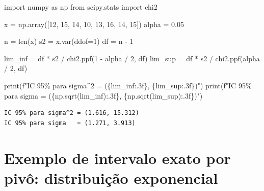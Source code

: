 \documentclass[
  letterpaper,
  DIV=11,
  numbers=noendperiod]{scrreprt}
\newenvironment{Shaded}{\begin{snugshade}}{\end{snugshade}}
\newcommand{\BuiltInTok}[1]{\textcolor[rgb]{0.00,0.23,0.31}{#1}}
\newcommand{\DecValTok}[1]{\textcolor[rgb]{0.68,0.00,0.00}{#1}}
\newcommand{\FloatTok}[1]{\textcolor[rgb]{0.68,0.00,0.00}{#1}}
\newcommand{\ImportTok}[1]{\textcolor[rgb]{0.00,0.46,0.62}{#1}}
\newcommand{\NormalTok}[1]{\textcolor[rgb]{0.00,0.23,0.31}{#1}}
\newcommand{\OperatorTok}[1]{\textcolor[rgb]{0.37,0.37,0.37}{#1}}
\newcommand{\SpecialCharTok}[1]{\textcolor[rgb]{0.37,0.37,0.37}{#1}}
\newcommand{\SpecialStringTok}[1]{\textcolor[rgb]{0.13,0.47,0.30}{#1}}
\begin{document}
\begin{Shaded}
\begin{Highlighting}[]
\ImportTok{import}\NormalTok{ numpy }\ImportTok{as}\NormalTok{ np}
\ImportTok{from}\NormalTok{ scipy.stats }\ImportTok{import}\NormalTok{ chi2}

\NormalTok{x }\OperatorTok{=}\NormalTok{ np.array([}\DecValTok{12}\NormalTok{, }\DecValTok{15}\NormalTok{, }\DecValTok{14}\NormalTok{, }\DecValTok{10}\NormalTok{, }\DecValTok{13}\NormalTok{, }\DecValTok{16}\NormalTok{, }\DecValTok{14}\NormalTok{, }\DecValTok{15}\NormalTok{])}
\NormalTok{alpha }\OperatorTok{=} \FloatTok{0.05}

\NormalTok{n }\OperatorTok{=} \BuiltInTok{len}\NormalTok{(x)}
\NormalTok{s2 }\OperatorTok{=}\NormalTok{ x.var(ddof}\OperatorTok{=}\DecValTok{1}\NormalTok{)}
\NormalTok{df }\OperatorTok{=}\NormalTok{ n }\OperatorTok{{-}} \DecValTok{1}

\NormalTok{lim\_inf }\OperatorTok{=}\NormalTok{ df }\OperatorTok{*}\NormalTok{ s2 }\OperatorTok{/}\NormalTok{ chi2.ppf(}\DecValTok{1} \OperatorTok{{-}}\NormalTok{ alpha }\OperatorTok{/} \DecValTok{2}\NormalTok{, df)}
\NormalTok{lim\_sup }\OperatorTok{=}\NormalTok{ df }\OperatorTok{*}\NormalTok{ s2 }\OperatorTok{/}\NormalTok{ chi2.ppf(alpha }\OperatorTok{/} \DecValTok{2}\NormalTok{, df)}

\BuiltInTok{print}\NormalTok{(}\SpecialStringTok{f"IC 95\% para sigma\^{}2 = (}\SpecialCharTok{\{}\NormalTok{lim\_inf}\SpecialCharTok{:.3f\}}\SpecialStringTok{, }\SpecialCharTok{\{}\NormalTok{lim\_sup}\SpecialCharTok{:.3f\}}\SpecialStringTok{)"}\NormalTok{)}
\BuiltInTok{print}\NormalTok{(}\SpecialStringTok{f"IC 95\% para sigma   = (}\SpecialCharTok{\{}\NormalTok{np}\SpecialCharTok{.}\NormalTok{sqrt(lim\_inf)}\SpecialCharTok{:.3f\}}\SpecialStringTok{, }\SpecialCharTok{\{}\NormalTok{np}\SpecialCharTok{.}\NormalTok{sqrt(lim\_sup)}\SpecialCharTok{:.3f\}}\SpecialStringTok{)"}\NormalTok{)}
\end{Highlighting}
\end{Shaded}

\begin{verbatim}
IC 95% para sigma^2 = (1.616, 15.312)
IC 95% para sigma   = (1.271, 3.913)
\end{verbatim}

\section{Exemplo de intervalo exato por pivô: distribuição
exponencial}\label{exemplo-de-intervalo-exato-por-pivuxf4-distribuiuxe7uxe3o-exponencial}
\end{document}
